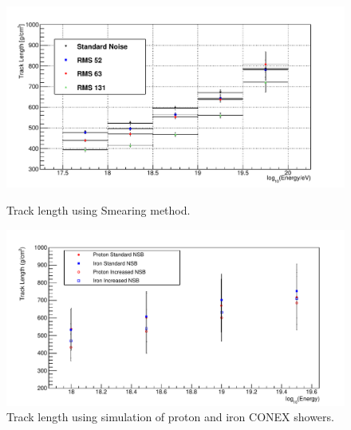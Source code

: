 \begin{figure}
\centering
\includegraphics[width=\textwidth]{chapters/graphs/SelectionEff/Smearing_TrackLength_DiffNSBlevels.pdf}
\caption{Track length using Smearing method.}
\vspace{3mm}
\includegraphics[width=\textwidth]{chapters/graphs/SelectionEff/Simulation_TrackLength_Comb_StandANdIncreasedNSB.pdf}
\caption{Track length using simulation of proton and iron CONEX showers.}
\end{figure}
